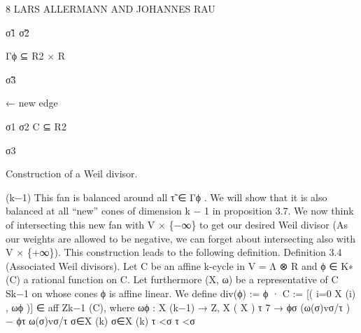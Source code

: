 \documentclass[
  11pt,
]{article}
\newenvironment{Shaded}{}{}
\newcommand{\NormalTok}[1]{#1}
\begin{document}
\begin{Shaded}
\begin{Highlighting}[]
\NormalTok{8                           LARS ALLERMANN AND JOHANNES RAU}




\NormalTok{                                                                  σ̃1}
\NormalTok{                                σ̃2}


\NormalTok{                                                         Γϕ ⊆ R2 × R}

\NormalTok{                                 σ̃3}


\NormalTok{                                                    ← new edge}


\NormalTok{                                                                 σ1}
\NormalTok{                                σ2                       C ⊆ R2}


\NormalTok{                                       σ3}

\NormalTok{                              Construction of a Weil divisor.}

\NormalTok{                                            (k−1)}
\NormalTok{This fan is balanced around all τ̃ ∈ Γϕ     . We will show that it is also balanced at all}
\NormalTok{“new” cones of dimension k − 1 in proposition 3.7.}
\NormalTok{We now think of intersecting this new fan with V × \{−∞\} to get our desired Weil divisor}
\NormalTok{(As our weights are allowed to be negative, we can forget about intersecting also with}
\NormalTok{V × \{+∞\}). This construction leads to the following definition.}
\NormalTok{Definition 3.4 (Associated Weil divisors). Let C be an affine k{-}cycle in V = Λ ⊗ R and}
\NormalTok{ϕ ∈ K∗ (C) a rational function on C. Let furthermore (X, ω) be a representative of C}
\NormalTok{                                                                      Sk−1}
\NormalTok{on whose cones ϕ is affine linear. We define div(ϕ) := ϕ · C := [( i=0 X (i) , ωϕ )] ∈}
\NormalTok{  aff}
\NormalTok{Zk−1  (C), where}
\NormalTok{          ωϕ : X (k−1)    → Z,}
\NormalTok{                              X                     ( X          )}
\NormalTok{                      τ   7 →   ϕσ (ω(σ)vσ/τ ) − ϕτ     ω(σ)vσ/τ}
\NormalTok{                               σ∈X (k)                                  σ∈X (k)}
\NormalTok{                                τ \textless{}σ                                     τ \textless{}σ}


\end{Highlighting}
\end{Shaded}
\end{document}
